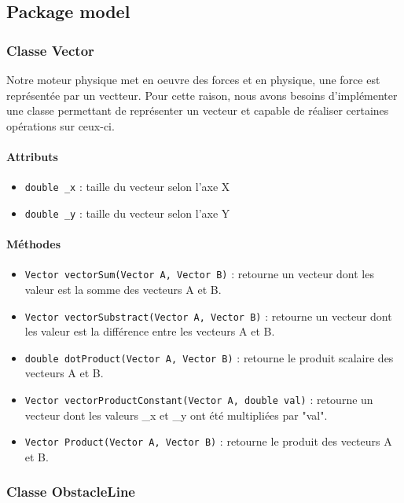 \documentclass{report}
\begin{document}
\subsection{Package model}

\subsubsection{Classe Vector}

Notre moteur physique met en oeuvre des forces et en physique, une force est représentée par un vectteur. Pour cette raison, nous avons besoins d'implémenter une classe permettant de représenter un vecteur et capable de réaliser certaines opérations sur ceux-ci.

\paragraph*{Attributs}
\begin{itemize}
\item \texttt{double \_x} : taille du vecteur selon l'axe X
\item \texttt{double \_y} : taille du vecteur selon l'axe Y
\end{itemize}

\paragraph*{Méthodes}
\begin{itemize}
\item \texttt{Vector vectorSum(Vector A, Vector B)} : retourne un vecteur dont les valeur est la somme des vecteurs A et B.
\item \texttt{Vector vectorSubstract(Vector A, Vector B)} : retourne un vecteur dont les valeur est la différence entre les vecteurs A et B.
\item \texttt{double dotProduct(Vector A, Vector B)} : retourne le produit scalaire des vecteurs A et B.
\item \texttt{Vector vectorProductConstant(Vector A, double val)} : retourne un vecteur dont les valeurs  \_x et \_y ont été multipliées par "val".
\item \texttt{Vector Product(Vector A, Vector B)} : retourne le produit des vecteurs A et B.
\end{itemize}

\subsubsection{Classe ObstacleLine}
\end{document}
